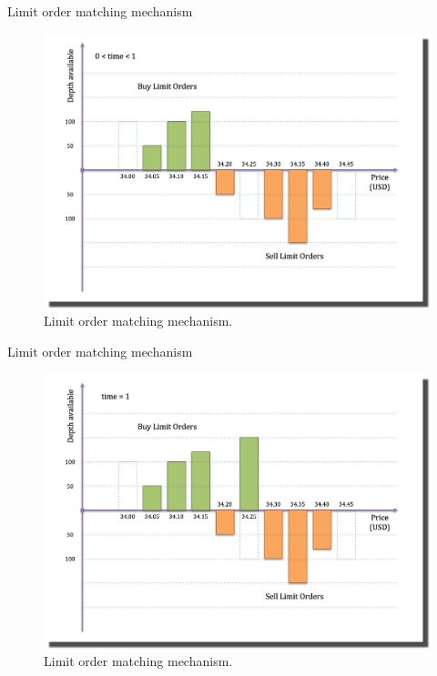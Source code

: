 \documentclass{beamer}
\begin{document}
\begin{frame}[shrink=30]{{\color{cyan}Limit order matching mechanism}}
\bigskip
\begin{figure}[H]
	\centering
	\includegraphics[height=0.9\textheight]{LOB_Match/LOB_Match_0.png}
        \caption{Limit order matching mechanism.}
        \label{fig:LOB_0}
\end{figure}
\end{frame}

\begin{frame}[shrink=30]{{\color{cyan}Limit order matching mechanism}}
\bigskip
\begin{figure}[H]
	\centering
	\includegraphics[height=0.9\textheight]{LOB_Match/LOB_Match_1.png}
        \caption{Limit order matching mechanism.}
        \label{fig:LOB_1}
\end{figure}
\end{frame}
\end{document}
